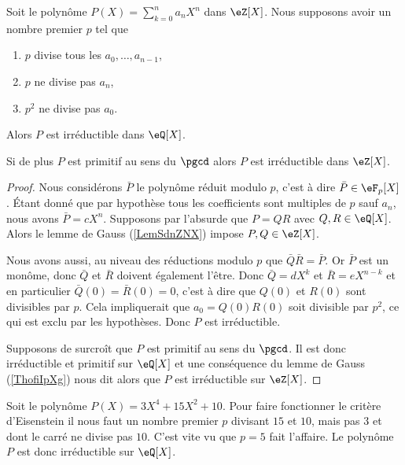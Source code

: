 \begin{proposition}
    Soit le polynôme \( P(X)=\sum_{k=0}^n a_nX^n\) dans \( \eZ[X]\). Nous supposons avoir un nombre premier \( p\) tel que
    \begin{enumerate}
        \item
            \( p\) divise tous les \( a_0,\ldots, a_{n-1}\),
        \item
            \( p\) ne divise pas \( a_n\),
        \item
            \( p^2\) ne divise pas \( a_0\).
    \end{enumerate}
    Alors \( P\) est irréductible dans \( \eQ[X]\).

    Si de plus \( P\) est primitif au sens du \( \pgcd\) alors \( P\) est irréductible dans \( \eZ[X]\).
\end{proposition}

\begin{proof}
    Nous considérons \( \bar P\) le polynôme réduit modulo \( p\), c'est à dire \( \bar P\in \eF_p[X]\). Étant donné que par hypothèse tous les coefficients sont multiples de \( p\) sauf \( a_n\), nous avons \( \bar P=cX^n\). Supposons par l'absurde que \( P=QR\) avec \( Q,R\in \eQ[X]\). Alors le lemme de Gauss (\ref{LemSdnZNX}) impose \( P,Q\in \eZ[X]\).

    Nous avons aussi, au niveau des réductions modulo \( p\) que $\bar Q\bar R=\bar P$. Or \( \bar P\) est un monôme, donc \( \bar Q\) et \( \bar R\) doivent également l'être. Donc \( \bar Q=dX^k\) et \( \bar R=eX^{n-k}\) et en particulier \( \bar Q(0)=\bar R(0)=0\), c'est à dire que \( Q(0)\) et \( R(0)\) sont divisibles par \( p\). Cela impliquerait que \( a_0=Q(0)R(0)\) soit divisible par \( p^2\), ce qui est exclu par les hypothèses. Donc \( P\) est irréductible.

    Supposons de surcroît que \( P\) est primitif au sens du \( \pgcd\). Il est donc irréductible et primitif sur \( \eQ[X]\) et une conséquence du lemme de Gauss (\ref{ThofiIpXg}) nous dit alors que \( P\) est irréductible sur \( \eZ[X]\).
\end{proof}

\begin{example}
    Soit le polynôme \( P(X)=3X^4+15 X^2+10\). Pour faire fonctionner le critère d'Eisenstein il nous faut un nombre premier \( p\) divisant \( 15\) et \( 10\), mais pas \( 3\) et dont le carré ne divise pas \( 10\). C'est vite vu que \( p=5\) fait l'affaire. Le polynôme \( P\) est donc irréductible sur \( \eQ[X]\).
\end{example}

